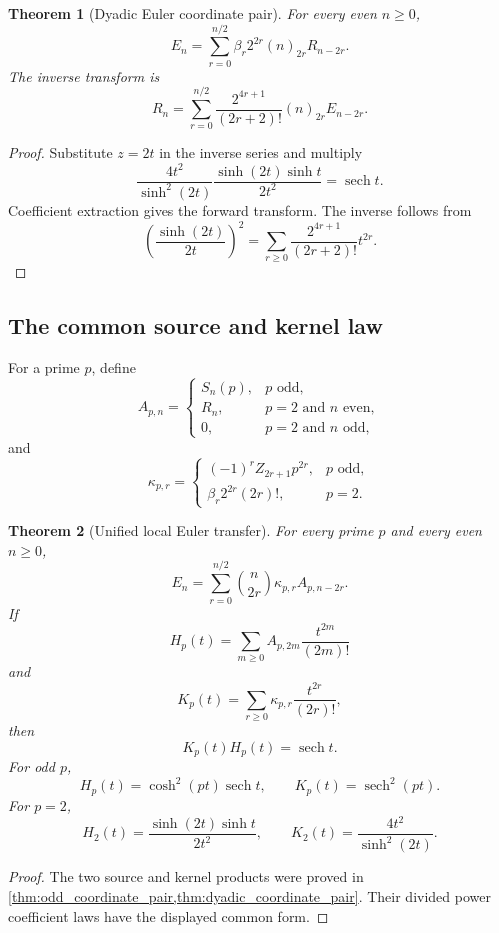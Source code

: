 \documentclass{aomart}
\newtheorem{theorem}{Theorem}[section]
\theoremstyle{definition}
\theoremstyle{remark}
\newcommand{\fall}[2]{(#1)_{#2}}
\begin{document}
\begin{theorem}[Dyadic Euler coordinate pair]\label{thm:dyadic_coordinate_pair}
For every even \(n\geq0\),
\[
\boxed{
E_n
=
\sum_{r=0}^{n/2}
\beta_r2^{2r}
\fall n{2r}
R_{n-2r}.
}
\]
The inverse transform is
\[
\boxed{
R_n
=
\sum_{r=0}^{n/2}
\frac{2^{4r+1}}{(2r+2)!}
\fall n{2r}
E_{n-2r}.
}
\]
\end{theorem}

\begin{proof}
Substitute \(z=2t\) in the inverse series and multiply
\[
\frac{4t^2}{\sinh^2(2t)}
\frac{\sinh(2t)\sinh t}{2t^2}
=
\operatorname{sech}t.
\]
Coefficient extraction gives the forward transform. The inverse follows from
\[
\left(\frac{\sinh(2t)}{2t}\right)^2
=
\sum_{r\geq0}
\frac{2^{4r+1}}{(2r+2)!}t^{2r}.
\]
\end{proof}

\subsection{The common source and kernel law}

For a prime \(p\), define
\[
A_{p,n}
=
\begin{cases}
S_n(p),&p\text{ odd},\\
R_n,&p=2\text{ and }n\text{ even},\\
0,&p=2\text{ and }n\text{ odd},
\end{cases}
\]
and
\[
\kappa_{p,r}
=
\begin{cases}
(-1)^rZ_{2r+1}p^{2r},&p\text{ odd},\\
\beta_r2^{2r}(2r)!,&p=2.
\end{cases}
\]

\begin{theorem}[Unified local Euler transfer]\label{thm:unified_local_euler}
For every prime \(p\) and every even \(n\geq0\),
\[
\boxed{
E_n
=
\sum_{r=0}^{n/2}
\binom n{2r}
\kappa_{p,r}
A_{p,n-2r}.
}
\]
If
\[
H_p(t)
=
\sum_{m\geq0}A_{p,2m}\frac{t^{2m}}{(2m)!}
\]
and
\[
K_p(t)
=
\sum_{r\geq0}\kappa_{p,r}\frac{t^{2r}}{(2r)!},
\]
then
\[
\boxed{K_p(t)H_p(t)=\operatorname{sech}t.}
\]
For odd \(p\),
\[
H_p(t)=\cosh^2(pt)\operatorname{sech}t,
\qquad
K_p(t)=\operatorname{sech}^2(pt).
\]
For \(p=2\),
\[
H_2(t)=\frac{\sinh(2t)\sinh t}{2t^2},
\qquad
K_2(t)=\frac{4t^2}{\sinh^2(2t)}.
\]
\end{theorem}

\begin{proof}
The two source and kernel products were proved in \cref{thm:odd_coordinate_pair,thm:dyadic_coordinate_pair}. Their divided power coefficient laws have the displayed common form.
\end{proof}
\end{document}
